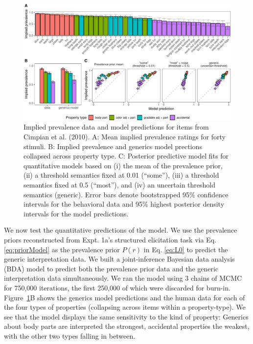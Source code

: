 \documentclass[,man,floatsintext]{apa6}
\theoremstyle{definition}
\theoremstyle{definition}
\theoremstyle{definition}
\theoremstyle{remark}
\begin{document}
\begin{figure}
\centering
\includegraphics{genint_files/figure-latex/cimpian-modelingResults-1.pdf}
\caption{\label{fig:cimpian-modelingResults}Implied prevalence data and
model predictions for items from Cimpian et al. (2010). A: Mean implied
prevalence ratings for forty stimuli. B: Implied prevalence and generics
model prections collapsed across property type. C: Posterior predictive
model fits for quantitative models based on (i) the mean of the
prevalence prior, (ii) a threshold semantics fixed at 0.01
(\enquote{some}), (iii) a threshold semantics fixed at 0.5
(\enquote{most}), and (iv) an uncertain threshold semantics (generic).
Error bars denote bootstrapped 95\% confidence intervals for the
behavioral data and 95\% highest posterior density intervals for the
model predictions.}
\end{figure}

We now test the quantitative predictions of the model. We use the
prevalence priors reconstructed from Expt. 1a's structured elicitation
task via Eq. \ref{eq:priorModel} as the prevalence prior \(P(r)\) in Eq.
\ref{eq:L0} to predict the generic interpretation data. We built a
joint-inference Bayesian data analysis (BDA) model to predict both the
prevalence prior data and the generic interpretation data
simultaneously. We ran the model using 3 chains of MCMC for 750,000
iterations, the first 250,000 of which were discarded for burn-in.
Figure~\ref{fig:cimpian-modelingResults}B shows the generics model
predictions and the human data for each of the four types of properties
(collapsing across items within a property-type). We see that the model
displays the same sensitivity to the kind of property: Generics about
body parts are interpreted the strongest, accidental properties the
weakest, with the other two types falling in between.
\end{document}

